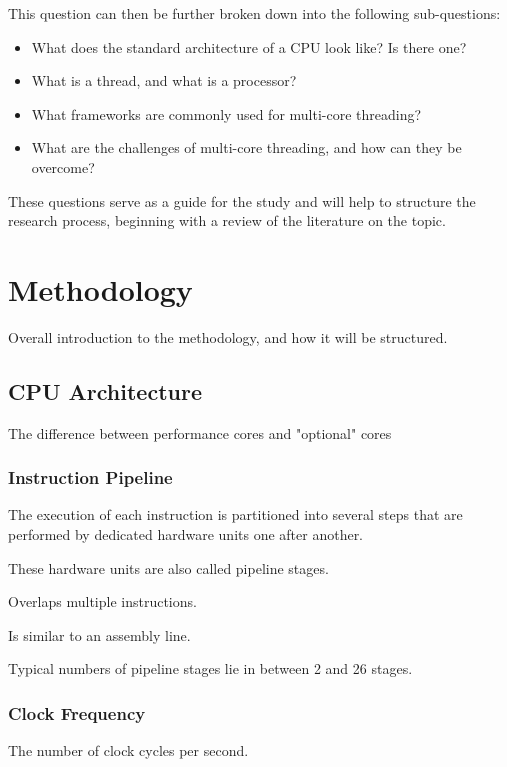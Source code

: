 \documentclass{article}
\begin{document}
This question can then be further broken down into the following sub-questions:

\begin{itemize}
    \item What does the standard architecture of a CPU look like? Is there one?
    \item What is a thread, and what is a processor?
    \item What frameworks are commonly used for multi-core threading?
    \item What are the challenges of multi-core threading, and how can they be overcome?
\end{itemize}

These questions serve as a guide for the study and will help to structure the research process, beginning with a review of the literature on the topic.

\section{Methodology}

Overall introduction to the methodology, and how it will be structured.

\subsection{CPU Architecture}

The difference between performance cores and "optional" cores

\subsubsection{Instruction Pipeline}
The execution of each instruction is partitioned into several steps that are performed by dedicated hardware units one after another.

These hardware units are also called pipeline stages.

Overlaps multiple instructions.

Is similar to an assembly line.

Typical numbers of pipeline stages lie in between 2 and 26 stages.

\subsubsection{Clock Frequency}

The number of clock cycles per second.
\end{document}
